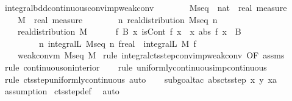 \documentclass{article}
\theoremstyle{definition}
\begin{document}
\begin{isabellebody}
\isamarkupfalse%
\ integral{\isacharunderscore}bdd{\isacharunderscore}continuous{\isacharunderscore}conv{\isacharunderscore}imp{\isacharunderscore}weak{\isacharunderscore}conv{\isacharcolon}\isanewline
\ \ \ \isanewline
\ \ \ \ M{\isacharunderscore}seq\ {\isacharcolon}{\isacharcolon}\ {\isachardoublequoteopen}nat\ {\isasymRightarrow}\ real\ measure{\isachardoublequoteclose}\ \isanewline
\ \ \ \ M\ {\isacharcolon}{\isacharcolon}\ {\isachardoublequoteopen}real\ measure{\isachardoublequoteclose}\isanewline
\ \ \ \isanewline
\ \ \ \ {\isachardoublequoteopen}{\isasymAnd}n{\isachardot}\ real{\isacharunderscore}distribution\ {\isacharparenleft}M{\isacharunderscore}seq\ n{\isacharparenright}{\isachardoublequoteclose}\ \ \isanewline
\ \ \ \ {\isachardoublequoteopen}real{\isacharunderscore}distribution\ M{\isachardoublequoteclose}\ \ \isanewline
\ \ \ \ {\isachardoublequoteopen}{\isasymAnd}f\ B{\isachardot}\ {\isacharparenleft}{\isasymAnd}x{\isachardot}\ isCont\ f\ x{\isacharparenright}\ {\isasymLongrightarrow}\ {\isacharparenleft}{\isasymAnd}x{\isachardot}\ abs\ {\isacharparenleft}f\ x{\isacharparenright}\ {\isasymle}\ B{\isacharparenright}\ {\isasymLongrightarrow}\isanewline
\ \ \ \ \ \ \ \ \ {\isacharparenleft}{\isasymlambda}n{\isachardot}\ integral\isactrlsup L\ {\isacharparenleft}M{\isacharunderscore}seq\ n{\isacharparenright}\ f{\isacharcolon}{\isacharcolon}real{\isacharparenright}\ {\isacharminus}{\isacharminus}{\isacharminus}{\isacharminus}{\isachargreater}\ integral\isactrlsup L\ M\ f{\isachardoublequoteclose}\isanewline
\ \ \ \isanewline
\ \ \ \ {\isachardoublequoteopen}weak{\isacharunderscore}conv{\isacharunderscore}m\ M{\isacharunderscore}seq\ M{\isachardoublequoteclose}\isanewline
{}\isamarkupfalse%
\ {\isacharparenleft}rule\ integral{\isacharunderscore}cts{\isacharunderscore}step{\isacharunderscore}conv{\isacharunderscore}imp{\isacharunderscore}weak{\isacharunderscore}conv\ {\isacharbrackleft}OF\ assms{\isacharbrackright}{\isacharparenright}\isanewline
\ \ \isamarkupfalse%
\ {\isacharparenleft}rule\ continuous{\isacharunderscore}on{\isacharunderscore}interior{\isacharparenright}\isanewline
\ \ \isamarkupfalse%
\ {\isacharparenleft}rule\ uniformly{\isacharunderscore}continuous{\isacharunderscore}imp{\isacharunderscore}continuous{\isacharparenright}\isanewline
\ \ \isamarkupfalse%
\ {\isacharparenleft}rule\ cts{\isacharunderscore}step{\isacharunderscore}uniformly{\isacharunderscore}continuous{\isacharcomma}\ auto{\isacharparenright}\isanewline
\ \ \isamarkupfalse%
\ {\isacharparenleft}subgoal{\isacharunderscore}tac\ {\isachardoublequoteopen}abs{\isacharparenleft}cts{\isacharunderscore}step\ x\ y\ xa{\isacharparenright}\ {\isasymle}\ {}{\isachardoublequoteclose}{\isacharparenright}\isanewline
\ \ \isamarkupfalse%
\ assumption\isanewline
{}\isamarkupfalse%
\ cts{\isacharunderscore}step{\isacharunderscore}def\ \isamarkupfalse%
\ auto%
\end{isabellebody}
\end{document}
